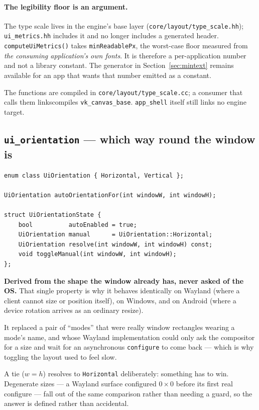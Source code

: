 \documentclass[11pt,a4paper]{article}
\begin{document}
\paragraph{The legibility floor is an argument.} The type scale lives in the
engine's base layer (\texttt{core/layout/type\_scale.hh}); \texttt{ui\_metrics.hh}
includes it and no longer includes a generated header.
\texttt{computeUiMetrics()} takes \texttt{minReadablePx}, the worst-case floor
measured from \emph{the consuming application's own fonts}. It is therefore a
per-application number and not a library constant. The generator in
Section~\ref{sec:mintext} remains available for an app that wants that number
emitted as a constant.

The functions are compiled in \texttt{core/layout/type\_scale.cc}; a consumer
that calls them links\/compiles \texttt{vk\_canvas\_base}. \texttt{app\_shell}
itself still links no engine target.

\subsection{\texttt{ui\_orientation} --- which way round the window is}

\begin{lstlisting}
enum class UiOrientation { Horizontal, Vertical };

UiOrientation autoOrientationFor(int windowW, int windowH);

struct UiOrientationState {
    bool          autoEnabled = true;
    UiOrientation manual      = UiOrientation::Horizontal;
    UiOrientation resolve(int windowW, int windowH) const;
    void toggleManual(int windowW, int windowH);
};
\end{lstlisting}

\textbf{Derived from the shape the window already has, never asked of the OS.}
That single property is why it behaves identically on Wayland (where a client
cannot size or position itself), on Windows, and on Android (where a device
rotation arrives as an ordinary resize).

It replaced a pair of ``modes'' that were really window rectangles wearing a
mode's name, and whose Wayland implementation could only ask the compositor for
a size and wait for an asynchronous \texttt{configure} to come back --- which is
why toggling the layout used to feel slow.

A tie ($w = h$) resolves to \texttt{Horizontal} deliberately: something has to
win. Degenerate sizes --- a Wayland surface configured $0\times0$ before its
first real configure --- fall out of the same comparison rather than needing a
guard, so the answer is defined rather than accidental.
\end{document}
